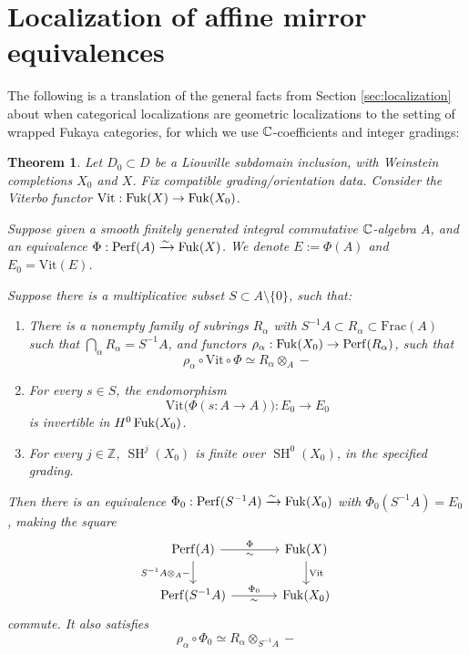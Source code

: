 \documentclass[12pt, letter]{amsart}
\newtheorem{theorem}{Theorem}[section]
\theoremstyle{definition}
\newcommand{\Z}{\mathbb Z}
\newcommand{\SH}{\operatorname{SH}}
\numberwithin{equation}{section}
\begin{document}
\section{Localization  of affine mirror equivalences}
\label{sec:affine-freezing}

The following is a translation of the general facts from Section \ref{sec:localization} about when categorical localizations are geometric localizations to the setting of wrapped Fukaya categories, for which we use $\mathbb C$-coefficients and integer gradings:

\begin{theorem}\label{thm:affine-freezing}
Let $D_0\subset D$ be a Liouville subdomain inclusion, with
 Weinstein completions $X_0$ and $X$.
Fix compatible grading/orientation data.  Consider the Viterbo functor 
$\mathrm{Vit}:\operatorname{Fuk}(X)\to\operatorname{Fuk}(X_0)$.

Suppose given a smooth finitely generated integral commutative $\mathbb C$-algebra $A$,
and an equivalence $\Phi:\mathrm{Perf}(A)\xrightarrow{\sim}\operatorname{Fuk}(X)$. 
We denote $E:= \Phi(A)$ and $E_0 = \mathrm{Vit}(E)$. 


Suppose there is a multiplicative subset $S\subset A\setminus\{0\}$, such that: 
\begin{enumerate}[label=\textup{(H\arabic*)}]
\item\label{hyp:restriction-rings}
There is a nonempty family of subrings  $R_\alpha$ with $S^{-1} A\subset R_\alpha\subset \mathrm{Frac}(A)$ such that $\bigcap_\alpha R_\alpha=S^{-1}A$,
and  functors $\rho_\alpha:\operatorname{Fuk}(X_0)\to\mathrm{Perf}(R_\alpha)$, such that
\begin{equation}\label{eq:restriction-input}
 \rho_\alpha\circ\mathrm{Vit} \circ \Phi
 \simeq R_\alpha\otimes_A-
\end{equation}
\item\label{hyp:denominator-units}
For every $s\in S$, the endomorphism
\[
 \mathrm{Vit}\bigl(\Phi(s:A\to A)\bigr):E_0\to E_0
\]
is invertible in $H^0\operatorname{Fuk}(X_0)$.
\item\label{hyp:restriction-finite}
For every $j\in\Z$, $\SH^j(X_0)$ is finite over $\SH^0(X_0)$,
in the specified grading.
\end{enumerate}
Then there is an equivalence $\Phi_0:\mathrm{Perf}(S^{-1}A)\xrightarrow{\sim}\operatorname{Fuk}(X_0)$
with $\Phi_0(S^{-1}A )=E_0$, making the square
\begin{equation}\label{eq:affine-freezing-square}
 \begin{tikzcd}[column sep=large]
 \Perf(A)\arrow[r,"\Phi","\sim"']
       \arrow[d,"S^{-1}A\otimes_A-"']
    &\Fuk(X)\arrow[d,"\mathrm{Vit}"]\\
 \Perf(S^{-1}A)\arrow[r,"\Phi_0","\sim"']&\Fuk(X_0)
 \end{tikzcd}
\end{equation}
commute. It also satisfies
\begin{equation}\label{eq:restriction-output}
 \rho_\alpha \circ \Phi_0 \simeq R_\alpha\otimes_{S^{-1} A}-
\end{equation}
\end{theorem}
\end{document}
